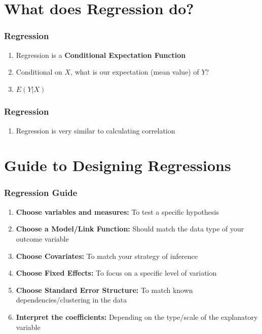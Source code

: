 \documentclass[xcolor=x11names,compress]{beamer}\usepackage[]{graphicx}\usepackage[]{color}
\renewcommand{\(}{\begin{columns}}
\renewcommand{\)}{\end{columns}}
\newcommand{\<}[1]{\begin{column}{#1}}
\renewcommand{\>}{\end{column}}
\begin{document}
\section{What does Regression do?}

\begin{frame}
\frametitle{Regression}
\begin{enumerate}
\item Regression is a \textbf{Conditional Expectation Function}
\pause
\item Conditional on $X$, what is our expectation (mean value) of $Y$?
\pause
\item $E(Y|X)$
\end{enumerate}
\end{frame}

\begin{frame}
\frametitle{Regression}
\begin{enumerate}
\item Regression is very similar to calculating correlation
\end{enumerate}
\end{frame}

\section{Guide to Designing Regressions}

\begin{frame}
\frametitle{Regression Guide}
\begin{enumerate}
\item \textbf{Choose variables and measures:} To test a specific hypothesis
\item \textbf{Choose a Model/Link Function:} Should match the data type of your outcome variable
\item \textbf{Choose Covariates:} To match your strategy of inference
\item \textbf{Choose Fixed Effects:} To focus on a specific level of variation
\item \textbf{Choose Standard Error Structure:} To match known dependencies/clustering in the data
\item \textbf{Interpret the coefficients:} Depending on the type/scale of the explanatory variable
\end{enumerate}
\end{frame}
\end{document}
